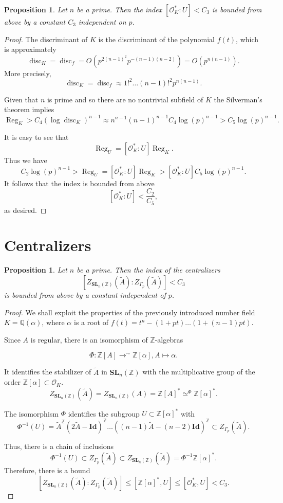\documentclass[a4paper]{article}
\newtheorem{Prop}[Thm]{Proposition}
\renewcommand{\O}{\mathcal{O}}        %
\newcommand{\Id}{\mathbf{Id}}        %
\newcommand{\SLp}{\Gamma_p}        %
\newcommand{\SLn}{\mathbf{SL}_n(\mathbb{Z})}        %
\DeclareMathOperator{\Reg}{Reg}        %
\DeclareMathOperator{\disc}{disc}        %
\begin{document}
\begin{Prop}
Let $n$ be a prime.
Then the index $[\O_K^* : U] < C_3$ is bounded from above by a constant $C_3$ independent on $p$.
\end{Prop}
\begin{proof}
The discriminant of $K$ is the discriminant of the polynomial $f(t)$, which is approximately
\[
	\disc_K = \disc_f = O( p^{2 (n - 1)^2} p^{-(n - 1) (n - 2)} ) = O ( p^{n (n - 1) } )
.\] 
More precisely,
\[
	\disc_K = \disc_f \approx 
	1!^2 \ldots (n-1)!^2 p^{n (n - 1) }
.\] 

Given that $n$ is prime and so there are no nontrivial subfield of $K$ the Silverman's theorem implies 
$$\Reg_K > C_4 (\log \disc_K)^{n-1} \approx n^{n-1} (n-1)^{n-1} C_4 \log(p)^{n-1}  > C_5\log(p)^{n-1}.$$

It is easy to see that 
\[
\Reg_U = [\O_K^* : U] \Reg_K
.\] 
Thus we have
\[
 C_2 \log(p)^{n-1} > \Reg_U = 
[\O_K^* : U] \Reg_K >
[\O_K^* : U] C_5 \log(p)^{n-1}
.\] 
It follows that the index is bounded from above
\[
[\O_K^* : U] < \frac{C_2}{C_5}
,\] 
as desired.
\end{proof}


\section{Centralizers}
\begin{Prop}
Let $n$ be a prime.  
Then the index of the centralizers
\[
	[Z_{\SLn}(\tilde A) : Z_{\SLp}(\tilde A)] < C_3
\] 
is bounded from above by a constant independent of $p$.
\end{Prop}
\begin{proof}
	We shall exploit the properties of the previously introduced number field $K = \mathbb{Q}(\alpha)$, where $\alpha$ is a root of $f(t) = t^n - (1 + pt) \ldots (1 + (n-1) pt)$.

Since $A$ is regular, 
there is an isomorphism of $\mathbb{Z}$-algebras 

\[
\Phi: \mathbb{Z}[A] 
\mathop{\longrightarrow}^{\sim}
\mathbb{Z}[\alpha], A \mapsto \alpha
.\] 

It identifies the stabilizer of $\tilde A$ in $\SLn$ with the multiplicative group of the order $\mathbb{Z}[\alpha] \subset \O_K$.
\[
Z_{\SLn}(\tilde A) 
= Z_{\SLn}(A) 
= \mathbb{Z}[A]^*
\mathop{\simeq }^{\Phi} 
\mathbb{Z}[\alpha]^*
.\] 

The isomorphism $\Phi$ identifies
the subgroup $U \subset \mathbb{Z}[\alpha]^*$ with
$$
\Phi^{-1} (U) = \tilde A^{\mathbb{Z}} (2 \tilde A - \Id )^{\mathbb{Z}} \ldots   ((n-1) \tilde A - (n-2) \Id )^{\mathbb{Z}} \subset Z_{\SLp}(\tilde A) 
.$$

Thus, there is a chain of inclusions
\[
\Phi^{-1} (U) \subset Z_{\SLp}(\tilde A) 
\subset Z_{\SLn}(\tilde A) = \Phi^{-1} \mathbb{Z}[\alpha]^*
.\] 
Therefore, there is a bound
\[
[Z_{\SLn}(\tilde A) : Z_{\SLp}(\tilde A) ]
\le
[\mathbb{Z}[\alpha]^*, U]
\le 
[\O_K^*, U] < C_3
.\] 
\end{proof}




\end{document}
